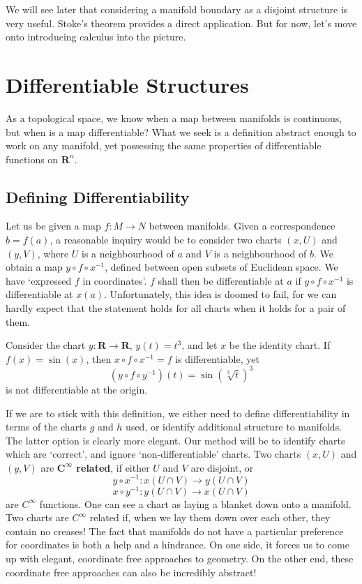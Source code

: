 We will see later that considering a manifold boundary as a disjoint structure is very useful. Stoke's theorem provides a direct application. But for now, let's move onto introducing calculus into the picture.








\chapter{Differentiable Structures}

As a topological space, we know when a map between manifolds is continuous, but when is a map differentiable? What we seek is a definition abstract enough to work on any manifold, yet possessing the same properties of differentiable functions on $\mathbf{R}^n$.

\section{Defining Differentiability}

Let us be given a map $f:M \to N$ between manifolds. Given a correspondence $b = f(a)$, a reasonable inquiry would be to consider two charts $(x,U)$ and $(y,V)$, where $U$ is a neighbourhood of $a$ and $V$ is a neighbourhood of $b$. We obtain a map $y \circ f \circ x^{-1}$, defined between open subsets of Euclidean space. We have `expressed $f$ in coordinates'. $f$ shall then be differentiable at $a$ if $y \circ f \circ x^{-1}$ is differentiable at $x(a)$. Unfortunately, this idea is doomed to fail, for we can hardly expect that the statement holds for all charts when it holds for a pair of them.

\begin{example}
    Consider the chart $y: \mathbf{R} \to \mathbf{R}$, $y(t) = t^3$, and let $x$ be the identity chart. If $f(x) = \sin(x)$, then $x \circ f \circ x^{-1} = f$ is differentiable, yet
    \[ (y \circ f \circ y^{-1})(t) = \sin(\sqrt[3]{t})^3 \]
    is not differentiable at the origin.
\end{example}

If we are to stick with this definition, we either need to define differentiability in terms of the charts $g$ and $h$ used, or identify additional structure to manifolds. The latter option is clearly more elegant. Our method will be to identify charts which are `correct', and ignore `non-differentiable' charts. Two charts $(x,U)$ and $(y,V)$ are {\bf $\mathbf{C^\infty}$ related}, if either $U$ and $V$ are disjoint, or
%
\[ y \circ x^{-1} : x(U \cap V) \to y(U \cap V) \]
%
\[ x \circ y^{-1} : y(U \cap V) \to x(U \cap V) \]
%
are $C^\infty$ functions. One can see a chart as laying a blanket down onto a manifold. Two charts are $C^\infty$ related if, when we lay them down over each other, they contain no creases! The fact that manifolds do not have a particular preference for coordinates is both a help and a hindrance. On one side, it forces us to come up with elegant, coordinate free approaches to geometry. On the other end, these coordinate free approaches can also be incredibly abstract!

